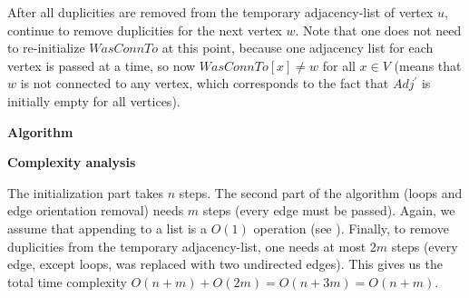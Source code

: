 After all duplicities are removed from the temporary adjacency-list of vertex
$u$, continue to remove duplicities for the next vertex $w$. Note that one does
not need to re-initialize $WasConnTo$ at this point, because one adjacency list
for each vertex is passed at a time, so now $WasConnTo[x] \neq w$ for all $x
\in V$ (means that $w$ is not connected to any vertex, which corresponds to the
fact that $Adj^{'}$ is initially empty for all vertices).

\textbf{Algorithm}

\begin{algorithm}[H]

\end{algorithm}

\textbf{Complexity analysis}

The initialization part takes $n$ steps. The second part of the algorithm
(loops and edge orientation removal) needs $m$ steps (every edge must be
passed). Again, we assume that appending to a list is a $O(1)$ operation (see
). Finally, to remove duplicities from the temporary
adjacency-list, one needs at most $2m$ steps (every edge, except loops, was
replaced with two undirected edges). This gives us the total time complexity
$O(n + m) + O(2m) = O(n + 3m) = O(n + m)$.


